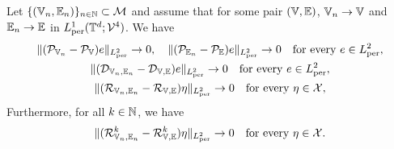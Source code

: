 \begin{proposition}\label{prop:strong_conv}
Let $\{(\mathbb{V}_n,\mathbb{E}_n)\}_{n\in\mathbb{N}}\subset{\mathcal{M}}$ and assume that for some pair $(\mathbb{V},\mathbb{E})$, $\mathbb{V}_n\to\mathbb{V}$ and $\mathbb{E}_n\to\mathbb{E}$ in $L^1_{\rm per}(\mathbb{T}^d;{\mathcal{V}}^4)$. We have
\begin{gather}
    \|({\mathcal{P}}_{\mathbb{V}_n}-{\mathcal{P}}_{\mathbb{V}})e\|_{L^2_{\rm per}}\to0,\quad \|({\mathcal{P}}_{\mathbb{E}_n}-{\mathcal{P}}_{\mathbb{E}})e\|_{L^2_{\rm per}}\to0\quad\text{for every }e\in L^2_{\rm per}, \label{eq:P_conv}\\
    \|({\mathcal{D}}_{\mathbb{V}_n,\mathbb{E}_n}-{\mathcal{D}}_{\mathbb{V},\mathbb{E}})e\|_{L^2_{\rm per}}\to0\quad\text{for every }e\in L^2_{\rm per}, \label{eq:D_conv}\\
    \|({\mathcal{R}}_{\mathbb{V}_n,\mathbb{E}_n}-{\mathcal{R}}_{\mathbb{V},\mathbb{E}})\eta\|_{L^2_{\rm per}}\to0\quad\text{for every }\eta\in{\mathcal{X}}, \label{eq:R_conv}
\end{gather}
Furthermore, for all $k\in\mathbb{N}$, we have
\begin{gather}
\|({\mathcal{R}}^k_{\mathbb{V}_n,\mathbb{E}_n}-{\mathcal{R}}^k_{\mathbb{V},\mathbb{E}})\eta\|_{L^2_{\rm per}}\to0\quad\text{for every }\eta\in{\mathcal{X}}. \label{eq:R_k_conv}
\end{gather}
\end{proposition}

